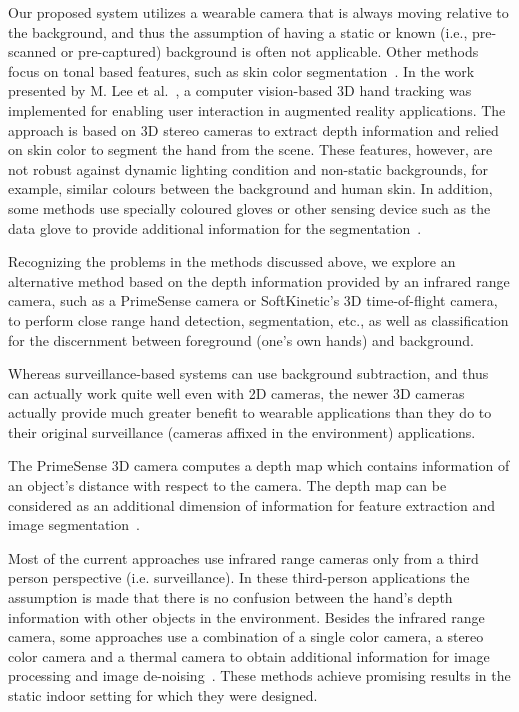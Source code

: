 Our proposed system utilizes a wearable camera that is always moving relative to the background, and thus the assumption of having a static or known (i.e., pre-scanned or pre-captured) background is often not applicable. Other methods focus on tonal based features, such as skin color segmentation~\cite{kjeldsen1996toward}. In the work presented by M. Lee et al.~\cite{lee20083d}, a computer vision-based 3D hand tracking was implemented for enabling user interaction in augmented reality applications. The approach is based on 3D stereo cameras to extract depth information and relied on skin color to segment the hand from the scene. These features, however, are not robust against dynamic lighting condition and non-static backgrounds, for example, similar colours between the background and human skin. In addition, some methods use specially coloured gloves or other sensing device such as the data glove to provide additional information for the segmentation~\cite{sturman1994survey}.

Recognizing the problems in the methods discussed above, we explore an alternative method based on the depth information provided by an infrared range camera, such as a PrimeSense camera or SoftKinetic's 3D time-of-flight camera, to perform close range hand detection, segmentation, etc., as well as classification for the discernment between foreground (one's own hands) and background. 

Whereas surveillance-based systems can use background subtraction, and thus can actually work quite well even with 2D cameras, the newer 3D cameras actually provide much greater benefit to wearable applications than they do to their original surveillance (cameras affixed in the environment) applications.

The PrimeSense 3D camera computes a depth map which contains information of an object's distance with respect to the camera. The depth map can be considered as an additional dimension of information for feature extraction and image segmentation~\cite{ren2011robust, uebersax2011real}.

Most of the current approaches use infrared range cameras only from a third person
perspective (i.e. surveillance). In these third-person applications the assumption is made that there is no confusion between the hand's depth information with other objects in the environment. Besides the infrared range camera, some approaches use a combination of a single color camera, a stereo color camera and a thermal camera to obtain additional information for image processing and image de-noising~\cite{appenrodt2010data}.  These methods achieve promising results in the static indoor setting for which they were designed. 

